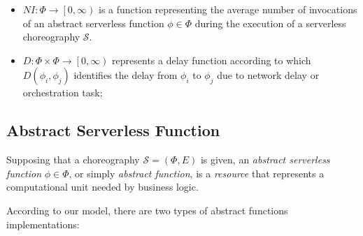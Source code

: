 \begin{itemize}
	\item $NI: \Phi \to \left[ 0, \infty \right)$ is a function representing the average number of invocations of an abstract serverless function $\phi \in \Phi$ during the execution of a serverless choreography $\mathcal{S}$.
	
	\item $D : \Phi \times \Phi \to \left[ 0, \infty \right)$ represents a delay function according to which $D\left(\phi_i, \phi_j \right)$ identifies the delay from $\phi_i$ to $\phi_j$ due to network delay or orchestration task;  
	
\end{itemize}

\subsection{Abstract Serverless Function}

Supposing that a choreography $\mathcal{S} = (\Phi,E)$ is given, an \textit{abstract serverless function} $\phi \in \Phi$, or simply \textit{abstract function}, is a \textit{resource} that represents a computational unit needed by business logic. 

According to our model, there are two types of abstract functions implementations:

